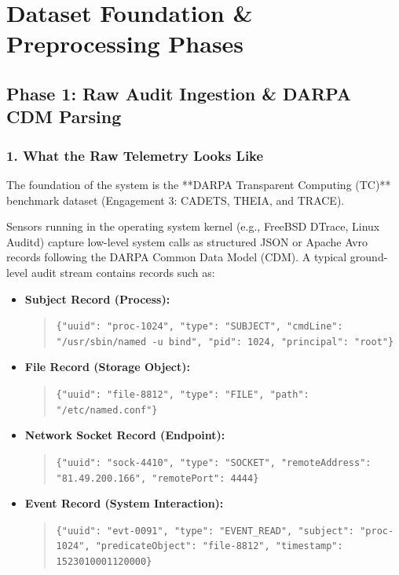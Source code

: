 \documentclass[11pt,a4paper]{report}
\begin{document}
\chapter{Dataset Foundation \& Preprocessing Phases}

\section{Phase 1: Raw Audit Ingestion \& DARPA CDM Parsing}

\subsection{1. What the Raw Telemetry Looks Like}
The foundation of the system is the **DARPA Transparent Computing (TC)** benchmark dataset (Engagement 3: CADETS, THEIA, and TRACE). 

Sensors running in the operating system kernel (e.g., FreeBSD DTrace, Linux Auditd) capture low-level system calls as structured JSON or Apache Avro records following the DARPA Common Data Model (CDM). A typical ground-level audit stream contains records such as:

\begin{itemize}
    \item \textbf{Subject Record (Process):}
    \begin{quote}
    \texttt{\{"uuid": "proc-1024", "type": "SUBJECT", "cmdLine": "/usr/sbin/named -u bind", "pid": 1024, "principal": "root"\}}
    \end{quote}
    \item \textbf{File Record (Storage Object):}
    \begin{quote}
    \texttt{\{"uuid": "file-8812", "type": "FILE", "path": "/etc/named.conf"\}}
    \end{quote}
    \item \textbf{Network Socket Record (Endpoint):}
    \begin{quote}
    \texttt{\{"uuid": "sock-4410", "type": "SOCKET", "remoteAddress": "81.49.200.166", "remotePort": 4444\}}
    \end{quote}
    \item \textbf{Event Record (System Interaction):}
    \begin{quote}
    \texttt{\{"uuid": "evt-0091", "type": "EVENT\_READ", "subject": "proc-1024", "predicateObject": "file-8812", "timestamp": 1523010001120000\}}
    \end{quote}
\end{itemize}
\end{document}
